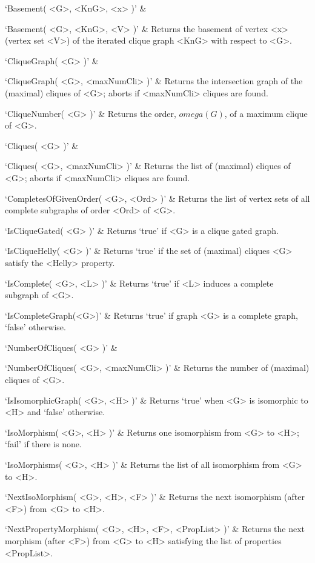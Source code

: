 
\beginitems
`Basement( <G>, <KnG>, <x> )' & 

`Basement( <G>, <KnG>, <V> )' & 
Returns the basement of vertex <x> (vertex set <V>) of the iterated clique graph <KnG> with respect to <G>.

`CliqueGraph( <G> )' & 

`CliqueGraph( <G>, <maxNumCli> )' & 
Returns the intersection graph of the (maximal) cliques of <G>; aborts if <maxNumCli> cliques are found.

`CliqueNumber( <G> )' & 
Returns the order, $omega(G)$, of a maximum clique of <G>.

`Cliques( <G> )' & 

`Cliques( <G>, <maxNumCli> )' & 
Returns the list of (maximal) cliques of <G>; aborts if <maxNumCli> cliques are found.

`CompletesOfGivenOrder( <G>, <Ord> )' & 
Returns the list of vertex sets of all complete subgraphs of order <Ord> of <G>.

`IsCliqueGated( <G> )' & 
Returns `true' if <G> is a clique gated graph.

`IsCliqueHelly( <G> )' & 
Returns  `true'  if  the  set of (maximal) cliques <G> satisfy the <Helly> property.

`IsComplete( <G>, <L> )' & 
Returns `true' if <L> induces a complete subgraph of <G>.

`IsCompleteGraph(<G>)' & 
Returns  `true'  if graph <G> is a complete graph, `false' otherwise.

`NumberOfCliques( <G> )' & 

`NumberOfCliques( <G>, <maxNumCli> )' & 
Returns  the  number of (maximal) cliques of <G>.
\enditems


\beginitems
`IsIsomorphicGraph( <G>, <H> )' & 
Returns `true' when <G> is isomorphic to <H> and `false' otherwise.

`IsoMorphism( <G>, <H> )' & 
Returns one isomorphism from <G> to <H>; `fail' if there is none.

`IsoMorphisms( <G>, <H> )' & 
Returns  the  list  of  all  isomorphism  from  <G> to <H>.

`NextIsoMorphism( <G>, <H>, <F> )' & 
Returns the next isomorphism  (after <F>) from <G> to <H>.

`NextPropertyMorphism( <G>, <H>, <F>, <PropList> )' & 
Returns the next morphism (after <F>) from <G> to <H> satisfying  the  list  of  properties  <PropList>.

